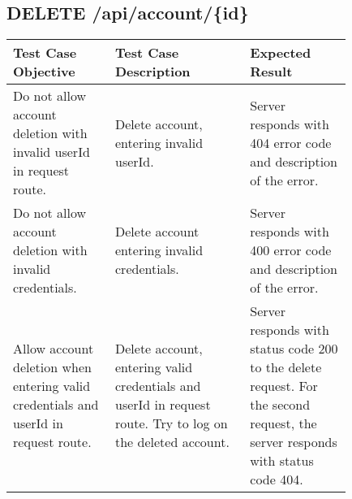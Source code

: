 \subsection{DELETE \slash api\slash account\slash \{id\}}
\begin{longtable}{p{0.25\linewidth}p{0.33\linewidth}p{0.25\linewidth}}
	\toprule
	\textbf{Test Case Objective}   & \textbf{Test Case Description} & \textbf{Expected Result}\\
	\midrule
	Do not allow account deletion with invalid userId in request route. & Delete account, entering invalid userId. &  Server responds with 404 error code and description of the error.\\
	Do not allow account deletion with invalid credentials. & Delete account entering invalid credentials. &  Server responds with 400 error code and description of the error.\\
	Allow account deletion when entering valid credentials and userId in request route. & Delete account, entering valid credentials and userId in request route. Try to log on the deleted account. &  Server responds with status code 200 to the delete request. For the second request, the server responds with status code 404.\\
	\bottomrule
\end{longtable}

